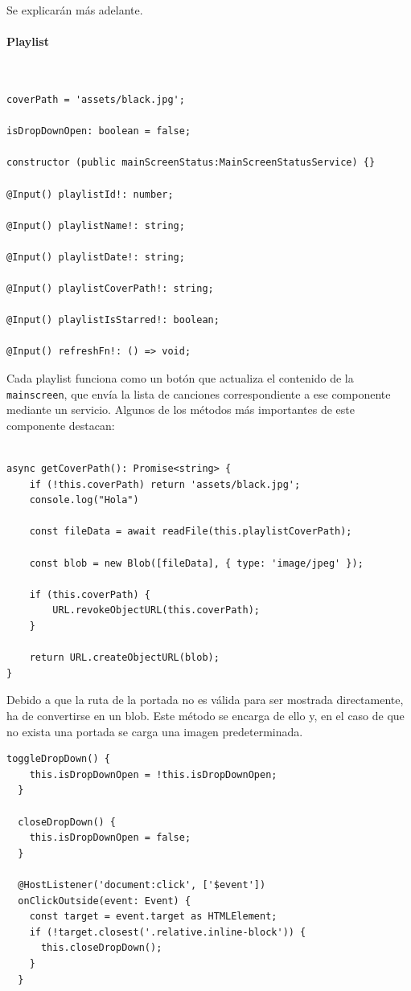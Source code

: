 \documentclass[11pt, a4paper]{article}
\begin{document}
            Se explicarán más adelante.

                \paragraph{Playlist}
                ‎ 

                \begin{lstlisting}[caption={Atributos y Constructora Playlist}]
coverPath = 'assets/black.jpg';

isDropDownOpen: boolean = false;

constructor (public mainScreenStatus:MainScreenStatusService) {}

@Input() playlistId!: number;

@Input() playlistName!: string;

@Input() playlistDate!: string;

@Input() playlistCoverPath!: string;

@Input() playlistIsStarred!: boolean;

@Input() refreshFn!: () => void;
                \end{lstlisting}

                Cada playlist funciona como un botón que actualiza el contenido de la \verb|mainscreen|, que envía la lista de canciones correspondiente a ese componente mediante un servicio. Algunos de los métodos más importantes de este componente destacan:

                \begin{lstlisting}[caption={getCoverPath()}]

async getCoverPath(): Promise<string> {
    if (!this.coverPath) return 'assets/black.jpg';
    console.log("Hola")

    const fileData = await readFile(this.playlistCoverPath);
        
    const blob = new Blob([fileData], { type: 'image/jpeg' });

    if (this.coverPath) {
        URL.revokeObjectURL(this.coverPath);
    }

    return URL.createObjectURL(blob);
}
                \end{lstlisting}

                Debido a que la ruta de la portada no es válida para ser mostrada directamente, ha de convertirse en un blob. Este método se encarga de ello y, en el caso de que no exista una portada se carga una imagen predeterminada.

                \begin{lstlisting}[caption={Dropdown}]
toggleDropDown() {
    this.isDropDownOpen = !this.isDropDownOpen;
  }

  closeDropDown() {
    this.isDropDownOpen = false;
  }

  @HostListener('document:click', ['$event'])
  onClickOutside(event: Event) {
    const target = event.target as HTMLElement;
    if (!target.closest('.relative.inline-block')) {
      this.closeDropDown();
    }
  }
                \end{lstlisting}
\end{document}
